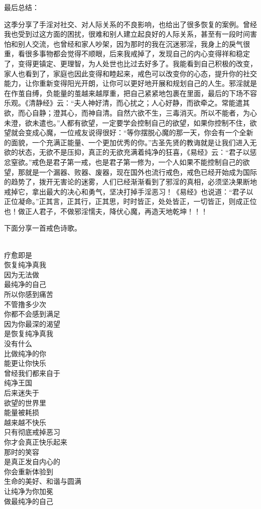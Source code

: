 最后总结：

这季分享了手淫对社交、对人际关系的不良影响，也给出了很多恢复的案例。曾经我也受到过这方面的困扰，很难和别人建立起良好的人际关系，甚至有一段时间害怕和别人交流，也曾经和家人吵架，因为那时的我在沉迷邪淫，我身上的戾气很重，看很多事物都会觉得不顺眼，后来我戒掉了，发现自己的内心变得祥和稳定了，变得更镇定、更理智，为人处世也比过去好多了。我能看到自己积极的改变，家人也看到了，家庭也因此变得和睦起来，戒色可以改变你的心态，提升你的社交能力，让你重新变得阳光开朗，让你可以更好地开展和规划自己的人生。邪淫就是在作茧自缚，负能量的茧越来越厚重，把自己紧紧地包裹在里面，最后的下场不容乐观。《清静经》云：“夫人神好清，而心扰之；人心好静，而欲牵之。常能遣其欲，而心自静；澄其心，而神自清。自然六欲不生，三毒消灭。所以不能者，为心未澄，欲未遣也。”人都有欲望，一定要学会控制自己的欲望，如果你控制不住，欲望就会变成心魔，一位戒友说得很好：“等你摆脱心魔的那一天，你会有一个全新的面貌，一个充满正能量、一个更加优秀的你。”古圣先贤的教诲就是让我们进入无欲的状态，无欲不是压抑，真正的无欲充满着纯净的狂喜，《易经》云：“君子以惩忿窒欲。”戒色是君子第一戒，也是君子第一修为，一个人如果不能控制自己的欲望，那就是一个漏器、败器、废器，现在国外也流行戒色，戒色已经开始成为国际的趋势了，拨开无害论的迷雾，人们已经渐渐看到了邪淫的真相，必须坚决果断地戒掉它，拿出最大的决心和勇气，坚决打掉手淫恶习！《易经》也说道：“君子以正位凝命。”正其言，正其行，正其思，时时皆正，处处皆正，一切皆正，则成正位也！做正人君子，不做邪淫懦夫，降伏心魔，再造天地乾坤！！！

下面分享一首戒色诗歌。

\begin{poem}[让纯净为你加冕]
    \begin{multicols}{3}
        \centering~\\
        疗愈即是 \\ 恢复纯净真我 \\ 因为无法做 \\ 最纯净的自己 \\ 所以你感到痛苦 \\ 不管撸多少次 \\ 你都不会感到满足 \\ 因为你最深的渴望 \\ 是恢复纯净真我 \\ 没有什么 \\ 比做纯净的你 \\ 能更让你快乐 \\ 曾经我们都来自于 \\ 纯净王国 \\ 后来迷失于 \\ 欲望的世界里 \\ 能量被耗损 \\ 越来越不快乐 \\ 只有彻底戒掉恶习 \\ 你才会真正快乐起来 \\ 那时的笑容 \\ 是真正发自内心的 \\ 你会重新体验到 \\ 生命的美好、和谐与圆满 \\ 让纯净为你加冕 \\ 做最纯净的自己
    \end{multicols}
\end{poem}

